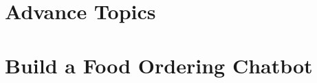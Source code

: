 % 

% 

% 
% 

% 
% 

% 
% 



% 

% 

\section[Adv]{Advance Topics}
% 



\section[Exercise]{Build a Food Ordering Chatbot}


% 
% 